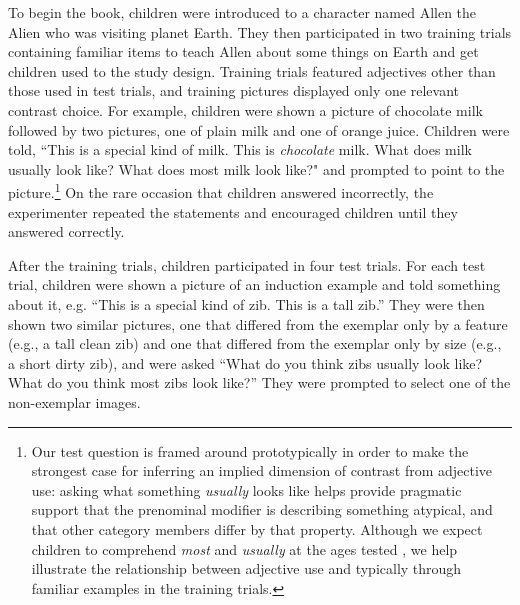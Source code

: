 \documentclass[man]{apa2}
\begin{document}
To begin the book, children were introduced to a character named Allen the Alien who was visiting planet Earth.  They then participated in two training trials containing familiar items to teach Allen about some things on Earth and get children used to the study design.  Training trials featured adjectives other than those used in test trials, and training pictures displayed only one relevant contrast choice.  For example, children were shown a picture of chocolate milk followed by two pictures, one of plain milk and one of orange juice. Children were told, ``This is a special kind of milk. This is \emph{chocolate} milk.  What does milk usually look like?  What does most milk look like?" and prompted to point to the picture.\footnote{Our test question is framed around prototypically in order to make the strongest case for inferring an implied dimension of contrast from adjective use: asking what something \emph{usually} looks like helps provide pragmatic support that the prenominal modifier is describing something atypical, and that other category members differ by that property. Although we expect children to comprehend \emph{most} and \emph{usually} at the ages tested \cite{halberda2008}, we help illustrate the relationship between adjective use and typically through familiar examples in the training trials.    }
On the rare occasion that children answered incorrectly, the experimenter repeated the statements and encouraged children until they answered correctly.  

After the training trials, children participated in four test trials.  For each test trial, children were shown a picture of an induction example and told something about it, e.g. ``This is a special kind of zib.  This is a tall zib.''  They were then shown two similar pictures, one that differed from the exemplar only by a feature (e.g., a tall clean zib) and one that differed from the exemplar only by size (e.g., a short dirty zib), and were asked ``What do you think zibs usually look like?  What do you think most zibs look like?'' They were prompted to select one of the non-exemplar images. 
\end{document}
